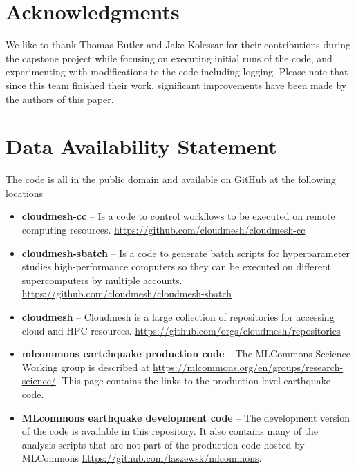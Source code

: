 \documentclass[utf8]{FrontiersinVancouver} %
\begin{document}
\section*{Acknowledgments}

We like to thank Thomas Butler and Jake Kolessar for their
contributions during the capstone project while focusing on executing
initial runs of the code, and experimenting with modifications to the
code including logging. Please note that since this team finished
their work, significant improvements have been made by the authors of
this paper.

\section*{Data Availability Statement}

The code is all in the public domain and available on GitHub at the following locations

\begin{itemize}

\item {\bf cloudmesh-cc} -- Is a code to control workflows to be executed on
  remote computing
  resources. \url{https://github.com/cloudmesh/cloudmesh-cc}

\item {\bf cloudmesh-sbatch} -- Is a code to generate batch scripts for
  hyperparameter studies high-performance computers so they can be
  executed on different supercomputers by multiple
  accounts. \url{https://github.com/cloudmesh/cloudmesh-sbatch}

\item {\bf cloudmesh} -- Cloudmesh is a large collection of repositories for
  accessing cloud and HPC
  resources. \url{https://github.com/orgs/cloudmesh/repositories}

\item {\bf mlcommons eartchquake production code} -- The MLCommons Sceience
  Working group is described at
  \url{https://mlcommons.org/en/groups/research-science/}. This page
  contains the links to the production-level earthquake code.

\item {\bf MLcommons earthquake development code} -- The development version of
  the code is available in this repository. It also contains many of
  the analysis scripts that are not part of the production code
  hosted by MLCommons \url{https://github.com/laszewsk/mlcommons}.

\end{itemize}


% 



\end{document}
